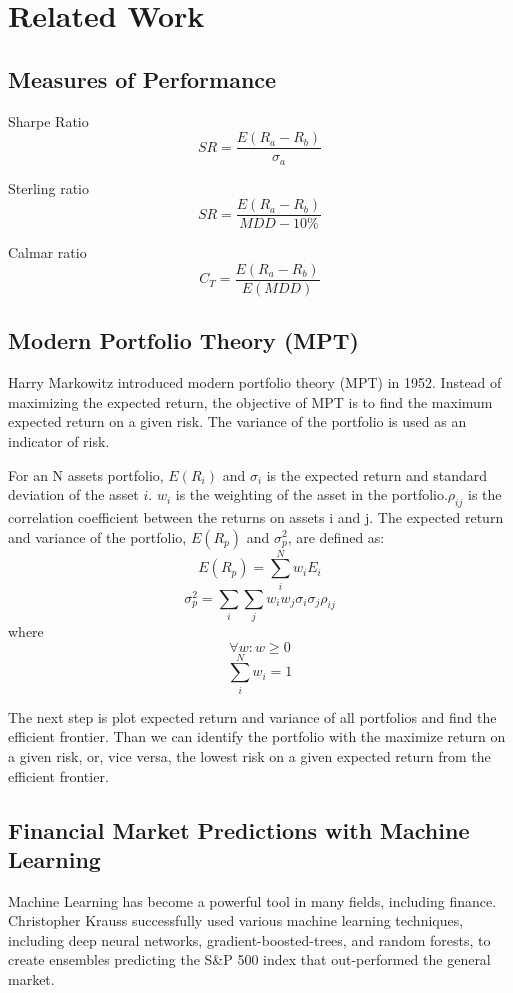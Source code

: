 \chapter{Related Work}
\label{c:related}


\section{Measures of Performance}
Sharpe Ratio\cite{Sharpe49}
\[ SR = \frac{E(R_a - R_b)}{\sigma_a}\]
\par
Sterling ratio\cite{magdon2004maximum}
\[ SR = \frac{E(R_a - R_b)}{MDD - 10\%}\]
\par
Calmar ratio\cite{young1991calmar}
\[C_T = \frac{E(R_a - R_b)}{E(MDD)}\]

\section{Modern Portfolio Theory (MPT)}
Harry Markowitz introduced modern portfolio theory (MPT) in 1952. Instead of maximizing the expected return, the objective of MPT is to find the maximum expected return on a given risk. The variance of the portfolio is used as an indicator of risk. \cite{10.2307/2975974}
\par
For an N assets portfolio, \(E(R_i)\) and  \(\sigma_i\) is the expected return and standard deviation of the asset \(i\). \(w_i\) is the weighting of the asset in the portfolio.\(\rho_{ij}\) is the correlation coefficient between the returns on assets i and j.
The expected return and variance of the portfolio, \(E(R_p)\) and \(\sigma_p^2\), are defined as:
\[ E(R_p) = \sum_i^N w_i E_i\]
\[\sigma_p^2 = \sum_i \sum_j w_i w_j \sigma_i \sigma_j \rho_{ij}\]
where
\[\forall w: w \geq 0\]
\[\sum_i ^N w_i = 1\]
\par
The next step is plot expected return and variance of all portfolios and find the efficient frontier. Than we can identify the portfolio with the maximize return on a given risk, or, vice versa, the lowest risk on a given expected return from the efficient frontier.

\section{Financial Market Predictions with Machine Learning}
Machine Learning has become a powerful tool in many fields, including finance. Christopher Krauss successfully used various machine learning techniques, including deep neural networks, gradient-boosted-trees, and random forests, to create ensembles predicting the S\&P 500 index that out-performed the general market. \cite{KRAUSS2017689} 
\par

